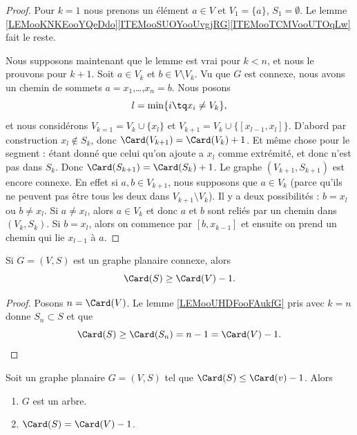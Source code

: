 \begin{proof}
	Pour \( k=1\) nous prenons un élément \( a\in V\) et \( V_1=\{ a \}\), \( S_1=\emptyset\). Le lemme \ref{LEMooKNKEooYQeDdo}\ref{ITEMooSUOYooUvgjRG}\ref{ITEMooTCMVooUTOqLw} fait le reste.

	Nous supposons maintenant que le lemme est vrai pour \( k<n\), et nous le prouvons pour \( k+1\). Soit \( a\in V_k\) et \( b\in V\setminus V_k\). Vu que \( G\) est connexe, nous avons un chemin de sommets \( a=x_1\),\ldots,\( x_n=b\). Nous posons
	\begin{equation}
		l=\min\{ i\tq x_i\neq V_k \},
	\end{equation}
	et nous considérons \( V_{k=1}=V_k\cup\{ x_l \}\) et \( V_{k+1}=V_k\cup\{ [x_{l-1},x_l] \}\). D'abord par construction \( x_l\not\in S_k\), donc \( \Card(V_{k+1})=\Card(V_k)+1\). Et même chose pour le segment : étant donné que celui qu'on ajoute a \( x_l\) comme extrémité, et donc n'est pas dans \( S_k\). Donc \( \Card(S_{k+1})=\Card(S_k)+1\). Le graphe \( (V_{k+1}, S_{k+1})\) est encore connexe. En effet si \( a,b\in V_{k+1}\), nous supposons que \( a\in V_k\) (parce qu'ils ne peuvent pas être tous les deux dans \( V_{k+1}\setminus V_k\)). Il y a deux possibilités : \( b=x_l\) ou \( b\neq x_l\). Si \( a\neq x_l\), alors \( a\in V_k\) et donc \( a\) et \( b\) sont reliés par un chemin dans \( (V_k,S_{k})\). Si \( b=x_l\), alors on commence par \( [b,x_{k-1}] \) et ensuite on prend un chemin qui lie \( x_{l-1}\) à \( a\).
\end{proof}


\begin{lemma}	\label{LEMooOXVEooGgvOnp}
	Si \( G=(V,S)\) est un graphe planaire connexe, alors
	\begin{equation}
		\Card(S)\geq \Card(V)-1.
	\end{equation}
\end{lemma}

\begin{proof}
	Posons \( n=\Card(V)\). Le lemme \ref{LEMooUHDFooFAukfG} pris avec \( k=n\) donne \( S_n\subset S\) et que
	\begin{equation}
		\Card(S)\geq \Card(S_n)=n-1=\Card(V)-1.
	\end{equation}
\end{proof}


\begin{proposition}	\label{PROPooPOEJooYHGsUD}
	Soit un graphe planaire \( G=(V,S)\) tel que \( \Card(S)\leq \Card(v)-1\). Alors
	\begin{enumerate}
		\item
		      \( G\) est un arbre.
		\item		\label{ITEMooANWEooEsAeEw}
		      \( \Card(S)=\Card(V)-1\).
	\end{enumerate}
\end{proposition}

